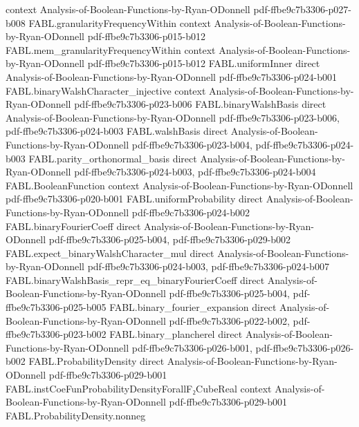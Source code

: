 \begin{theorem}
  {context}
  {Analysis-of-Boolean-Functions-by-Ryan-ODonnell}
  {pdf-ffbe9c7b3306-p027-b008}
\proofstep
  {FABL.granularityFrequencyWithin}
  {context}
  {Analysis-of-Boolean-Functions-by-Ryan-ODonnell}
  {pdf-ffbe9c7b3306-p015-b012}
\proofstep
  {FABL.mem_granularityFrequencyWithin}
  {context}
  {Analysis-of-Boolean-Functions-by-Ryan-ODonnell}
  {pdf-ffbe9c7b3306-p015-b012}
\proofstep
  {FABL.uniformInner}
  {direct}
  {Analysis-of-Boolean-Functions-by-Ryan-ODonnell}
  {pdf-ffbe9c7b3306-p024-b001}
\proofstep
  {FABL.binaryWalshCharacter_injective}
  {context}
  {Analysis-of-Boolean-Functions-by-Ryan-ODonnell}
  {pdf-ffbe9c7b3306-p023-b006}
\proofstep
  {FABL.binaryWalshBasis}
  {direct}
  {Analysis-of-Boolean-Functions-by-Ryan-ODonnell}
  {pdf-ffbe9c7b3306-p023-b006,
    pdf-ffbe9c7b3306-p024-b003}
\proofstep
  {FABL.walshBasis}
  {direct}
  {Analysis-of-Boolean-Functions-by-Ryan-ODonnell}
  {pdf-ffbe9c7b3306-p023-b004,
    pdf-ffbe9c7b3306-p024-b003}
\proofstep
  {FABL.parity_orthonormal_basis}
  {direct}
  {Analysis-of-Boolean-Functions-by-Ryan-ODonnell}
  {pdf-ffbe9c7b3306-p024-b003,
    pdf-ffbe9c7b3306-p024-b004}
\proofstep
  {FABL.BooleanFunction}
  {context}
  {Analysis-of-Boolean-Functions-by-Ryan-ODonnell}
  {pdf-ffbe9c7b3306-p020-b001}
\proofstep
  {FABL.uniformProbability}
  {direct}
  {Analysis-of-Boolean-Functions-by-Ryan-ODonnell}
  {pdf-ffbe9c7b3306-p024-b002}
\proofstep
  {FABL.binaryFourierCoeff}
  {direct}
  {Analysis-of-Boolean-Functions-by-Ryan-ODonnell}
  {pdf-ffbe9c7b3306-p025-b004,
    pdf-ffbe9c7b3306-p029-b002}
\proofstep
  {FABL.expect_binaryWalshCharacter_mul}
  {direct}
  {Analysis-of-Boolean-Functions-by-Ryan-ODonnell}
  {pdf-ffbe9c7b3306-p024-b003,
    pdf-ffbe9c7b3306-p024-b007}
\proofstep
  {FABL.binaryWalshBasis_repr_eq_binaryFourierCoeff}
  {direct}
  {Analysis-of-Boolean-Functions-by-Ryan-ODonnell}
  {pdf-ffbe9c7b3306-p025-b004,
    pdf-ffbe9c7b3306-p025-b005}
\proofstep
  {FABL.binary_fourier_expansion}
  {direct}
  {Analysis-of-Boolean-Functions-by-Ryan-ODonnell}
  {pdf-ffbe9c7b3306-p022-b002,
    pdf-ffbe9c7b3306-p023-b002}
\proofstep
  {FABL.binary_plancherel}
  {direct}
  {Analysis-of-Boolean-Functions-by-Ryan-ODonnell}
  {pdf-ffbe9c7b3306-p026-b001,
    pdf-ffbe9c7b3306-p026-b002}
\proofstep
  {FABL.ProbabilityDensity}
  {direct}
  {Analysis-of-Boolean-Functions-by-Ryan-ODonnell}
  {pdf-ffbe9c7b3306-p029-b001}
\proofstep
  {FABL.instCoeFunProbabilityDensityForallF₂CubeReal}
  {context}
  {Analysis-of-Boolean-Functions-by-Ryan-ODonnell}
  {pdf-ffbe9c7b3306-p029-b001}
\proofstep
  {FABL.ProbabilityDensity.nonneg}

\end{theorem}

